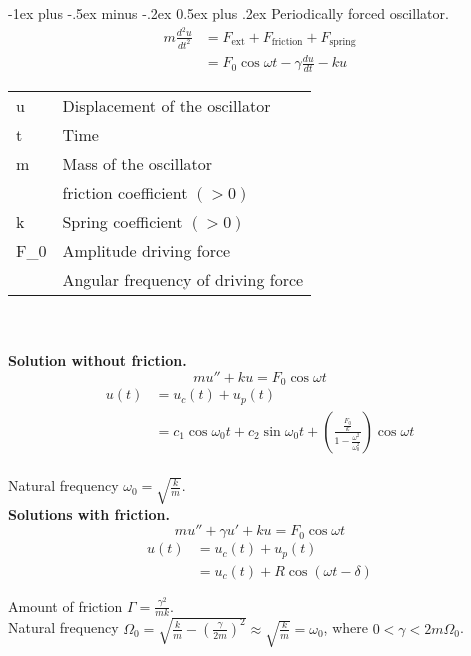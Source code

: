 \documentclass[10pt,landscape,a4paper]{article}
\makeatletter
\renewcommand{\section}{\@startsection{section}{1}{0mm}%
	{-1ex plus -.5ex minus -.2ex}%
	{0.5ex plus .2ex}%
	{\normalfont\large\bfseries}}
\makeatother
\begin{document}
\begin{multicols}{3}
		\section{Periodically forced oscillator.}
			\begin{align*}
				m \frac{d^2u}{dt^2} &= F_{\text{ext}} + F_{\text{friction}} + F_{\text{spring}}\\
				&= F_0 \cos{\omega t} - \gamma \frac{du}{dt} - ku
			\end{align*}
			\begin{tabular}{M |l}
				u      & Displacement of the oscillator\\
				t      & Time\\
				m      & Mass of the oscillator\\
				\gamma & friction coefficient $(>0)$\\
				k      & Spring coefficient $(>0)$\\
				F_0    & Amplitude driving force\\
				\omega & Angular frequency of driving force
			\end{tabular}\\~\\
		\textbf{Solution without friction.}\\
		\[
			m u'' + ku = F_0 \cos{\omega t}
		\]
			\begin{align*}
				u(t) &= u_c(t) + u_p(t)\\
				&= c_1 \cos{\omega_0 t} + c_2 \sin{\omega_0 t} + \left( \frac{\frac{F_0}{k}}{1 - \frac{\omega^2}{\omega_0^2}} \right) \cos{\omega t}
			\end{align*}\\
		Natural frequency $ \omega_0 = \sqrt{\frac{k}{m}} $.\\
		\textbf{Solutions with friction.}\\
		\[
			m u'' + \gamma u' + ku = F_0 \cos{\omega t}
		\]
		\begin{align*}
			u(t) & = u_c(t) + u_p(t)\\
			&= u_c(t) + R \cos{(\omega t - \delta)}
		\end{align*}
		
		Amount of friction $ \Gamma = \frac{\gamma^2}{m k} $.\\
		Natural frequency $ \Omega_0 = \sqrt{\frac{k}{m} - \left(\frac{\gamma}{2 m}\right)^2} \approx \sqrt{\frac{k}{m}} = \omega_0 $, where $ 0 < \gamma < 2m\Omega_0 $.\\
		
		

\end{multicols}
\end{document}
